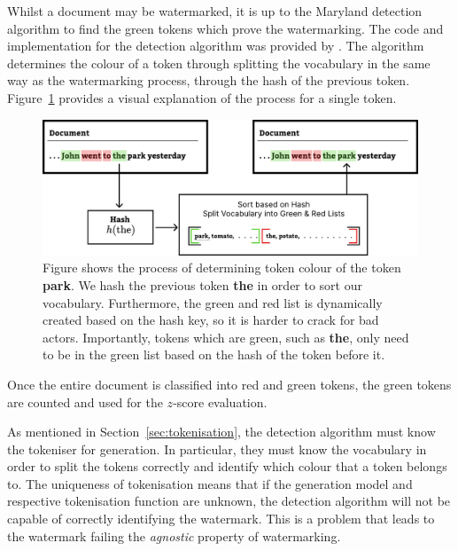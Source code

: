 \documentclass{l4proj}
\theoremstyle{definition}
\begin{document}
        Whilst a document may be watermarked, it is up to the Maryland detection algorithm to find the green tokens which prove the watermarking. The code and implementation for the detection algorithm was provided by \citet{kirchenbauer2023watermark}. The algorithm determines the colour of a token through splitting the vocabulary in the same way as the watermarking process, through the hash of the previous token. Figure~\ref{fig:maryland-detection-process} provides a visual explanation of the process for a single token.

        \begin{figure}[ht]
            \centering
            \includegraphics[width=1\linewidth, keepaspectratio]{images/methods/maryland-detection-process.pdf}
            \caption{Figure shows the process of determining token colour of the token \textbf{park}. We hash the previous token \textbf{the} in order to sort our vocabulary. Furthermore, the green and red list is dynamically created based on the hash key, so it is harder to crack for bad actors. Importantly, tokens which are green, such as \textbf{the}, only need to be in the green list based on the hash of the token before it.}
            \label{fig:maryland-detection-process}
        \end{figure}

        Once the entire document is classified into red and green tokens, the green tokens are counted and used for the $z$-score evaluation.

        As mentioned in Section~\ref{sec:tokenisation}, the detection algorithm must know the tokeniser for generation. In particular, they must know the vocabulary in order to split the tokens correctly and identify which colour that a token belongs to. The uniqueness of tokenisation means that if the generation model and respective tokenisation function are unknown, the detection algorithm will not be capable of correctly identifying the watermark. This is a problem that leads to the watermark failing the \emph{agnostic} property of watermarking.
\end{document}
